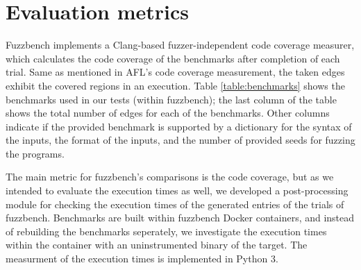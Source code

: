 \section{Evaluation metrics}
\label{sec:ch4-metrics}


Fuzzbench implements a Clang-based fuzzer-independent code coverage measurer, which calculates the code coverage of the benchmarks after completion of each trial. Same as mentioned in AFL's code coverage measurement, the taken edges exhibit the covered regions in an execution. Table \ref{table:benchmarks} shows the benchmarks used in our tests (within fuzzbench); the last column of the table shows the total number of edges for each of the benchmarks. Other columns indicate if the provided benchmark is supported by a dictionary for the syntax of the inputs, the format of the inputs, and the number of provided seeds for fuzzing the programs. 

\begin{table}[]
    \centering
    \caption{List of benchmarks used in evaluation}
    \label{table:benchmarks}
\end{table}


The main metric for fuzzbench's comparisons is the code coverage, but as we intended to evaluate the execution times as well, we developed a post-processing module for checking the execution times of the generated entries of the trials of fuzzbench. Benchmarks are built within fuzzbench Docker containers, and instead of rebuilding the benchmarks seperately, we investigate the execution times within the container with an uninstrumented binary of the target. The measurment of the execution times is implemented in Python 3.

